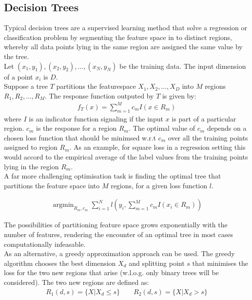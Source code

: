 \documentclass[a4paper, 11pt]{article}
\DeclareMathOperator*{\argmin}{argmin} %
\begin{document}
\subsection{Decision Trees}

Typical decision trees are a supervised learning method that solve a regression or classification problem by segmenting the feature space in to distinct regions, whereby all data points lying in the same region are assigned the same value by the tree. \\

Let ${(x_1,y_1),(x_2, y_2), \ldots, (x_N, y_N)}$ be the training data. The input dimension of a point $x_i$ is $D$.\\

Suppose a tree $T$ partitions the featurespace $X_1, X_2, \ldots, X_D$ into $M$ regions $R_1, R_2, \ldots, R_M$. The response function  outputed by $T$ is given by:
\begin{align*}
f_T(x) = \sum_{m = 1}^{M} c_m I(x \in R_m)
\end{align*}
where $I$ is an indicator function signaling if the input $x$ is part of a particular region. $c_m$ is the response for a region $R_m$. The optimal value of $c_m$ depends on a chosen loss function that should be minimsed w.r.t $c_m$ over all the training points assigned to region $R_m$. As an example, for square loss in a regression setting this would accord to the empirical average of the label values from the training points lying in the region $R_m$. \\

A far more challenging optimisation task is finding the optimal tree that partitions the feature space into $M$ regions, for a given loss function $l$.

\begin{align*}
\argmin_{R_m, c_m} \sum_{i =1}^{N} l(y_i, \sum_{m = 1}^{M} c_m I(x_i \in R_m))
\end{align*}

The possibilities of partitioning feature space grows exponentially with the number of features, rendering the encounter of an optimal tree in most cases computationally infeasable. \\

As an alternative, a greedy approximation approach can be used. The greedy algorithm chooses the best dimension $X_d$ and splitting point $s$ that minimises the loss for the two new regions that arise (w.l.o.g. only binary trees will be considered). The two new regions are defined as:
\begin{align*}
R_1(d, s) = \{X | X_d \leq s\} \qquad R_2(d, s) = \{X | X_d > s \}
\end{align*}
\end{document}
